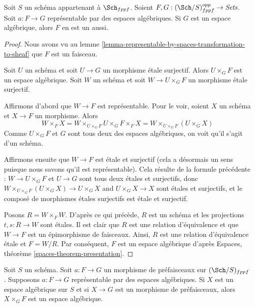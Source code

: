 \begin{lemma}
\label{lemma-representable-by-spaces-over-space}
Soit $S$ un schéma appartenant à $\Sch_{fppf}$.
Soient $F, G : (\Sch/S)_{fppf}^{opp} \to \textit{Sets}$.
Soit $a : F \to G$ représentable par des espaces algébriques.
Si $G$ est un espace algébrique, alors $F$ en est un aussi.
\end{lemma}

\begin{proof}
Nous avons vu au
lemme \ref{lemma-representable-by-spaces-transformation-to-sheaf}
que $F$ est un faisceau.

\medskip\noindent
Soit $U$ un schéma et soit $U \to G$ un morphisme étale surjectif.
Alors $U \times_G F$ est un espace algébrique. Soit $W$ un schéma
et soit $W \to U \times_G F$ un morphisme étale surjectif.

\medskip\noindent
Affirmons d'abord que $W \to F$ est représentable.
Pour le voir, soient $X$ un schéma et $X \to F$ un morphisme.
Alors
$$
W \times_F X = W \times_{U \times_G F} U \times_G F \times_F X
= W \times_{U \times_G F} (U \times_G X)
$$
Comme $U \times_G F$ et $G$ sont tous deux des espaces algébriques, on voit
qu'il s'agit d'un schéma.

\medskip\noindent
Affirmons ensuite que $W \to F$ est étale et surjectif (cela a désormais
un sens puisque nous savons qu'il est représentable). Cela résulte de la
formule précédente : $W \to U \times_G F$ et $U \to G$
sont tous deux étales et surjectifs, donc
$W \times_{U \times_G F} (U \times_G X) \to U \times_G X$ and
$U \times_G X \to X$ sont étales et surjectifs, et le composé de
morphismes étales surjectifs est étale et surjectif.

\medskip\noindent
Posons $R = W \times_F W$. D'après ce qui précède, $R$ est un schéma et
les projections $t, s : R \to W$
sont étales. Il est clair que $R$ est une relation d'équivalence et que
$W \to F$ est un épimorphisme de faisceaux. Ainsi, $R$ est une relation
d'équivalence étale et $F = W/R$. Par conséquent, $F$ est un espace algébrique d'après
Espaces,
théorème \ref{spaces-theorem-presentation}.
\end{proof}

\begin{lemma}
\label{lemma-representable-by-spaces}
Soit $S$ un schéma.
Soit $a : F \to G$ un morphisme de préfaisceaux sur $(\Sch/S)_{fppf}$.
Supposons $a : F \to G$ représentable par des espaces algébriques.
Si $X$ est un espace algébrique sur $S$ et si $X \to G$ est un morphisme de préfaisceaux,
alors $X \times_G F$ est un espace algébrique.
\end{lemma}

